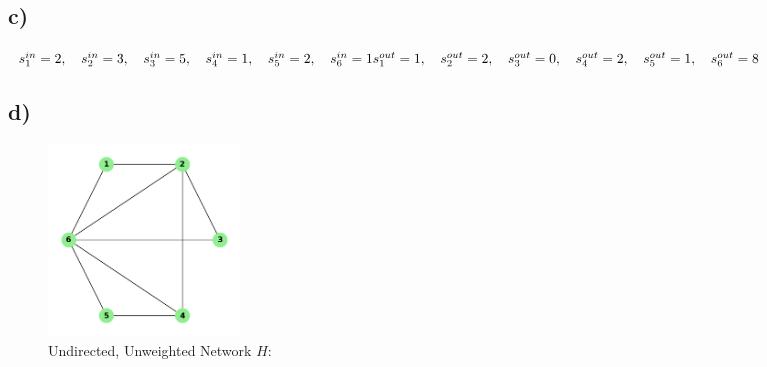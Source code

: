 \documentclass{article}
\begin{document}
        \subsection*{c)}
            \begin{minipage}[t]{1\textwidth}
                $s_{1}^{in} = 2, \hspace{10pt} s_{2}^{in} = 3, \hspace{10pt} s_{3}^{in} = 5, \hspace{10pt} s_{4}^{in} = 1
                , \hspace{10pt} s_{5}^{in} = 2, \hspace{10pt} s_{6}^{in} = 1\\\\
                s_{1}^{out} = 1, \hspace{10pt} s_{2}^{out} = 2, \hspace{10pt} s_{3}^{out} = 0, \hspace{10pt} s_{4}^{out} = 2
                , \hspace{10pt} s_{5}^{out} = 1, \hspace{10pt} s_{6}^{out} = 8
                $
            \end{minipage}

        \subsection*{d)}
            \begin{figure}[ht] %
                \begin{minipage}[t]{0.5\textwidth}
                    \centering
                    \captionsetup{labelformat=empty} %
                    \caption{Undirected, Unweighted Network $H$:}
                    \includegraphics[width=2in]{undirected.png}
                \end{minipage}%
            \end{figure}
\end{document}
